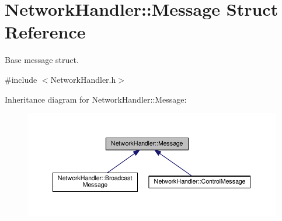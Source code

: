 \hypertarget{structNetworkHandler_1_1Message}{}\section{Network\+Handler\+:\+:Message Struct Reference}
\label{structNetworkHandler_1_1Message}


Base message struct.  




{\ttfamily \#include $<$Network\+Handler.\+h$>$}



Inheritance diagram for Network\+Handler\+:\+:Message\+:\nopagebreak
\begin{figure}[H]
\begin{center}
\leavevmode
\includegraphics[width=350pt]{structNetworkHandler_1_1Message__inherit__graph}
\end{center}
\end{figure}
